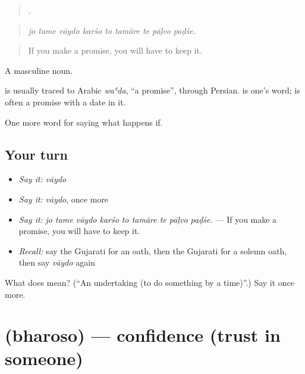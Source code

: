 \begin{quote}
        .
\end{quote}

\begin{quote}
\emph{jo tame vāydo karśo to tamāre te pāḷvo paḍśe.}
\end{quote}

\begin{quote}
If you make a promise, you will have to keep it.
\end{quote}

A masculine noun.

\begin{cousinweb}
is usually traced to Arabic \emph{waʿda}, \textquotedblleft{}a promise\textquotedblright{}, through Persian. \textbf{} is one's word; \textbf{} is often a promise with a date in it.
\end{cousinweb}

\begin{grammarlens}[title={What you've built}]
One more word for saying what happens if.
\end{grammarlens}

\subsection*{Your turn}
\begin{itemize}
\raggedright
  \item \emph{Say it:} \emph{vāydo}
  \item \emph{Say it:} \emph{vāydo}, once more
  \item \emph{Say it:} \emph{jo tame vāydo karśo to tamāre te pāḷvo paḍśe.} — If you make a promise, you will have to keep it.
  \item \emph{Recall:} say the Gujarati for an oath, then the Gujarati for a solemn oath, then say \emph{vāydo} again
\end{itemize}

\begin{tcolorbox}[breakable,colback=teal!4,colframe=teal!35!black,title={Before you move on}]
What does  mean? (\textquotedblleft{}An undertaking (to do something by a time)\textquotedblright{}.) Say it once more.
\end{tcolorbox}
\section[\texorpdfstring{\gu{ભરોસો} (bharoso)}{ભરોસો (bharoso)}]{ (bharoso) — confidence (trust in someone)}

